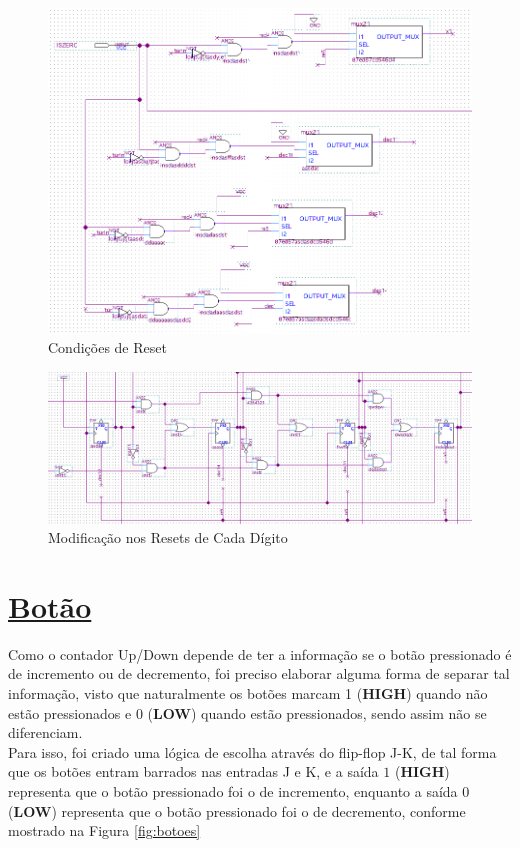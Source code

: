 \documentclass[14pt, oneside]{book}
\newcommand\tab[1][1cm]{\hspace*{#1}}
\theoremstyle{definition}
\begin{document}
                \begin{figure}[h!]
                    \centering
                    \includegraphics[scale=0.7]{decremento.png}
                    \caption{Condições de Reset}
                    \label{fig:decremento}
                \end{figure}
            
                \begin{figure}[!h]
                    \centering
                    \includegraphics[scale=0.6]{resets.png}
                    \caption{Modificação nos Resets de Cada Dígito}
                    \label{fig:resets}
                \end{figure}
                
            \section[Botão]{\hyperlink{toc}{Botão}}
                \tab Como o contador Up/Down depende de ter a informação se o botão pressionado é de incremento ou de decremento, foi preciso elaborar alguma forma de separar tal informação, visto que naturalmente os botões marcam 1 (\textbf{HIGH}) quando não estão pressionados e 0 (\textbf{LOW}) quando estão pressionados, sendo assim não se diferenciam. \\
                \tab Para isso, foi criado uma lógica de escolha através do flip-flop J-K, de tal forma que os botões entram barrados nas entradas J e K, e a saída $1$ (\textbf{HIGH}) representa que o botão pressionado foi o de incremento, enquanto a saída $0$ (\textbf{LOW}) representa que o botão pressionado foi o de decremento, conforme mostrado na Figura \ref{fig:botoes}
                
\end{document}
